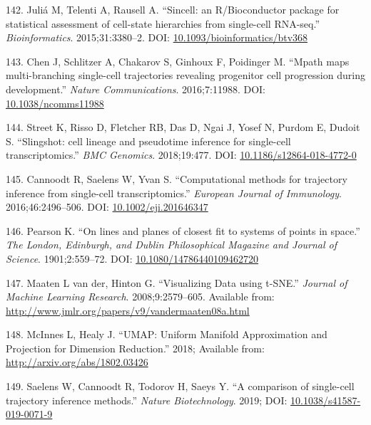 \documentclass[11pt,a4paper,titlepage,twoside,openright]{style/unimelbthesis}
\theoremstyle{definition}
\theoremstyle{definition}
\theoremstyle{definition}
\theoremstyle{remark}
\begin{document}
\begin{mainmatter}
\leavevmode\hypertarget{ref-Julia2015-fz}{}%
142. Juliá M, Telenti A, Rausell A. ``Sincell: an R/Bioconductor package for statistical assessment of cell-state hierarchies from single-cell RNA-seq.'' \emph{Bioinformatics}. 2015;31:3380--2. DOI: \href{https://doi.org/10.1093/bioinformatics/btv368}{10.1093/bioinformatics/btv368}

\leavevmode\hypertarget{ref-Chen2016-kx}{}%
143. Chen J, Schlitzer A, Chakarov S, Ginhoux F, Poidinger M. ``Mpath maps multi-branching single-cell trajectories revealing progenitor cell progression during development.'' \emph{Nature Communications}. 2016;7:11988. DOI: \href{https://doi.org/10.1038/ncomms11988}{10.1038/ncomms11988}

\leavevmode\hypertarget{ref-Street2018-sc}{}%
144. Street K, Risso D, Fletcher RB, Das D, Ngai J, Yosef N, Purdom E, Dudoit S. ``Slingshot: cell lineage and pseudotime inference for single-cell transcriptomics.'' \emph{BMC Genomics}. 2018;19:477. DOI: \href{https://doi.org/10.1186/s12864-018-4772-0}{10.1186/s12864-018-4772-0}

\leavevmode\hypertarget{ref-Cannoodt2016-iv}{}%
145. Cannoodt R, Saelens W, Yvan S. ``Computational methods for trajectory inference from single-cell transcriptomics.'' \emph{European Journal of Immunology}. 2016;46:2496--506. DOI: \href{https://doi.org/10.1002/eji.201646347}{10.1002/eji.201646347}

\leavevmode\hypertarget{ref-Pearson1901-gm}{}%
146. Pearson K. ``On lines and planes of closest fit to systems of points in space.'' \emph{The London, Edinburgh, and Dublin Philosophical Magazine and Journal of Science}. 1901;2:559--72. DOI: \href{https://doi.org/10.1080/14786440109462720}{10.1080/14786440109462720}

\leavevmode\hypertarget{ref-Maaten2008-ne}{}%
147. Maaten L van der, Hinton G. ``Visualizing Data using t-SNE.'' \emph{Journal of Machine Learning Research}. 2008;9:2579--605. Available from: \url{http://www.jmlr.org/papers/v9/vandermaaten08a.html}

\leavevmode\hypertarget{ref-McInnes2018-ul}{}%
148. McInnes L, Healy J. ``UMAP: Uniform Manifold Approximation and Projection for Dimension Reduction.'' 2018; Available from: \url{http://arxiv.org/abs/1802.03426}

\leavevmode\hypertarget{ref-Saelens2019-rs}{}%
149. Saelens W, Cannoodt R, Todorov H, Saeys Y. ``A comparison of single-cell trajectory inference methods.'' \emph{Nature Biotechnology}. 2019; DOI: \href{https://doi.org/10.1038/s41587-019-0071-9}{10.1038/s41587-019-0071-9}


\end{mainmatter}
\end{document}
